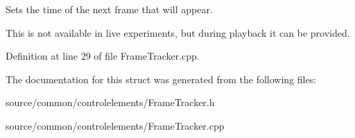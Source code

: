 Sets the time of the next frame that will appear. 

This is not available in live experiments, but during playback it can be provided. 

Definition at line 29 of file Frame\-Tracker.\-cpp.



The documentation for this struct was generated from the following files\-:\begin{DoxyCompactItemize}
\item 
source/common/controlelements/Frame\-Tracker.\-h\item 
source/common/controlelements/Frame\-Tracker.\-cpp\end{DoxyCompactItemize}
